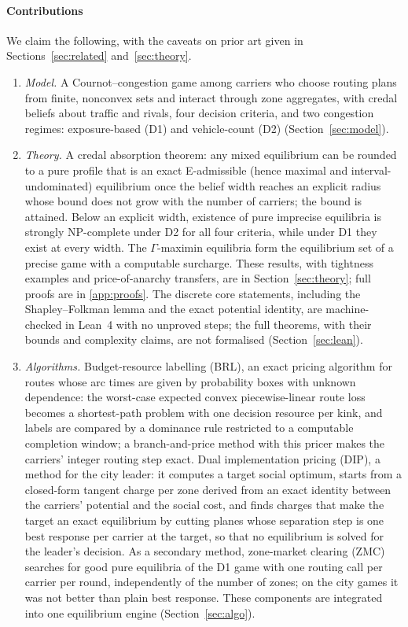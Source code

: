 \documentclass[preprint,12pt]{elsarticle}
\theoremstyle{definition}
\theoremstyle{remark}
\begin{document}
\paragraph{Contributions} We claim the following, with the caveats on prior art given in Sections~\ref{sec:related} and~\ref{sec:theory}.
\begin{enumerate}[label=(\roman*),leftmargin=*]
\item \emph{Model.} A Cournot--congestion game among carriers who choose routing plans from finite, nonconvex sets and interact through zone aggregates, with credal beliefs about traffic and rivals, four decision criteria, and two congestion regimes: exposure-based (D1) and vehicle-count (D2) (Section~\ref{sec:model}).
\item \emph{Theory.} A credal absorption theorem: any mixed equilibrium can be rounded to a pure profile that is an exact E-admissible (hence maximal and interval-undominated) equilibrium once the belief width reaches an explicit radius whose bound does not grow with the number of carriers; the bound is attained. Below an explicit width, existence of pure imprecise equilibria is strongly NP-complete under D2 for all four criteria, while under D1 they exist at every width. The $\Gamma$-maximin equilibria form the equilibrium set of a precise game with a computable surcharge. These results, with tightness examples and price-of-anarchy transfers, are in Section~\ref{sec:theory}; full proofs are in \ref{app:proofs}. The discrete core statements, including the Shapley--Folkman lemma and the exact potential identity, are machine-checked in Lean~4 with no unproved steps; the full theorems, with their bounds and complexity claims, are not formalised (Section~\ref{sec:lean}).
\item \emph{Algorithms.} Budget-resource labelling (BRL), an exact pricing algorithm for routes whose arc times are given by probability boxes with unknown dependence: the worst-case expected convex piecewise-linear route loss becomes a shortest-path problem with one decision resource per kink, and labels are compared by a dominance rule restricted to a computable completion window; a branch-and-price method with this pricer makes the carriers' integer routing step exact. Dual implementation pricing (DIP), a method for the city leader: it computes a target social optimum, starts from a closed-form tangent charge per zone derived from an exact identity between the carriers' potential and the social cost, and finds charges that make the target an exact equilibrium by cutting planes whose separation step is one best response per carrier at the target, so that no equilibrium is solved for the leader's decision. As a secondary method, zone-market clearing (ZMC) searches for good pure equilibria of the D1 game with one routing call per carrier per round, independently of the number of zones; on the city games it was not better than plain best response. These components are integrated into one equilibrium engine (Section~\ref{sec:algo}).

\end{enumerate}
\end{document}
